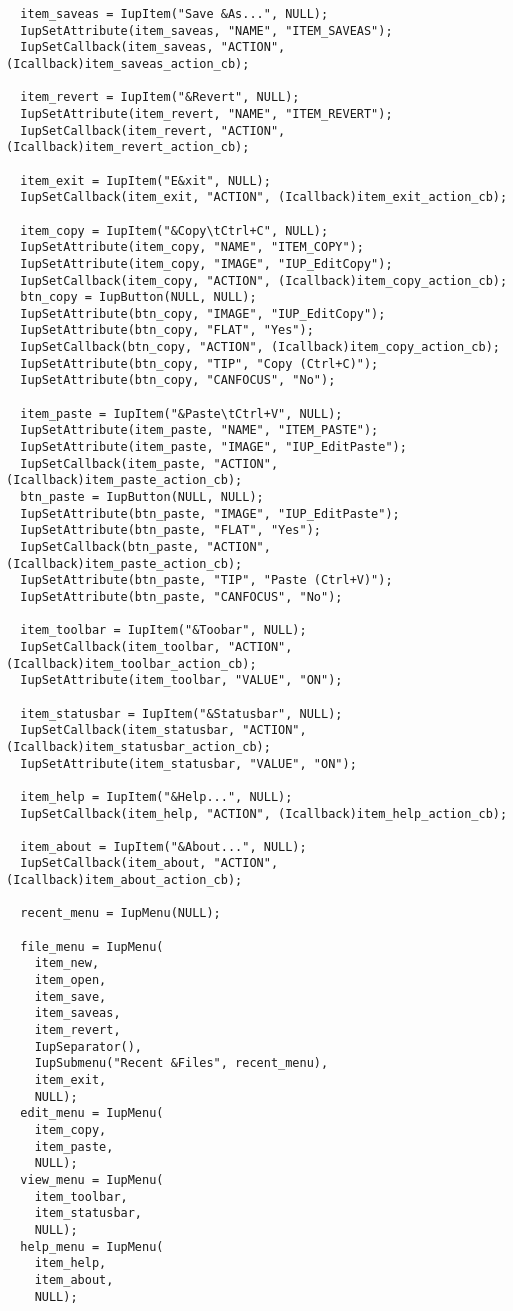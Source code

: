 \documentclass{ctexart}
\begin{document}
\begin{lstlisting}
  item_saveas = IupItem("Save &As...", NULL);
  IupSetAttribute(item_saveas, "NAME", "ITEM_SAVEAS");
  IupSetCallback(item_saveas, "ACTION", (Icallback)item_saveas_action_cb);

  item_revert = IupItem("&Revert", NULL);
  IupSetAttribute(item_revert, "NAME", "ITEM_REVERT");
  IupSetCallback(item_revert, "ACTION", (Icallback)item_revert_action_cb);

  item_exit = IupItem("E&xit", NULL);
  IupSetCallback(item_exit, "ACTION", (Icallback)item_exit_action_cb);

  item_copy = IupItem("&Copy\tCtrl+C", NULL);
  IupSetAttribute(item_copy, "NAME", "ITEM_COPY");
  IupSetAttribute(item_copy, "IMAGE", "IUP_EditCopy");
  IupSetCallback(item_copy, "ACTION", (Icallback)item_copy_action_cb);
  btn_copy = IupButton(NULL, NULL);
  IupSetAttribute(btn_copy, "IMAGE", "IUP_EditCopy");
  IupSetAttribute(btn_copy, "FLAT", "Yes");
  IupSetCallback(btn_copy, "ACTION", (Icallback)item_copy_action_cb);
  IupSetAttribute(btn_copy, "TIP", "Copy (Ctrl+C)");
  IupSetAttribute(btn_copy, "CANFOCUS", "No");

  item_paste = IupItem("&Paste\tCtrl+V", NULL);
  IupSetAttribute(item_paste, "NAME", "ITEM_PASTE");
  IupSetAttribute(item_paste, "IMAGE", "IUP_EditPaste");
  IupSetCallback(item_paste, "ACTION", (Icallback)item_paste_action_cb);
  btn_paste = IupButton(NULL, NULL);
  IupSetAttribute(btn_paste, "IMAGE", "IUP_EditPaste");
  IupSetAttribute(btn_paste, "FLAT", "Yes");
  IupSetCallback(btn_paste, "ACTION", (Icallback)item_paste_action_cb);
  IupSetAttribute(btn_paste, "TIP", "Paste (Ctrl+V)");
  IupSetAttribute(btn_paste, "CANFOCUS", "No");

  item_toolbar = IupItem("&Toobar", NULL);
  IupSetCallback(item_toolbar, "ACTION", (Icallback)item_toolbar_action_cb);
  IupSetAttribute(item_toolbar, "VALUE", "ON");

  item_statusbar = IupItem("&Statusbar", NULL);
  IupSetCallback(item_statusbar, "ACTION", (Icallback)item_statusbar_action_cb);
  IupSetAttribute(item_statusbar, "VALUE", "ON");

  item_help = IupItem("&Help...", NULL);
  IupSetCallback(item_help, "ACTION", (Icallback)item_help_action_cb);

  item_about = IupItem("&About...", NULL);
  IupSetCallback(item_about, "ACTION", (Icallback)item_about_action_cb);

  recent_menu = IupMenu(NULL);

  file_menu = IupMenu(
    item_new,
    item_open,
    item_save,
    item_saveas,
    item_revert,
    IupSeparator(),
    IupSubmenu("Recent &Files", recent_menu),
    item_exit,
    NULL);
  edit_menu = IupMenu(
    item_copy,
    item_paste,
    NULL);
  view_menu = IupMenu(
    item_toolbar,
    item_statusbar,
    NULL);
  help_menu = IupMenu(
    item_help,
    item_about,
    NULL);


\end{lstlisting}
\end{document}
